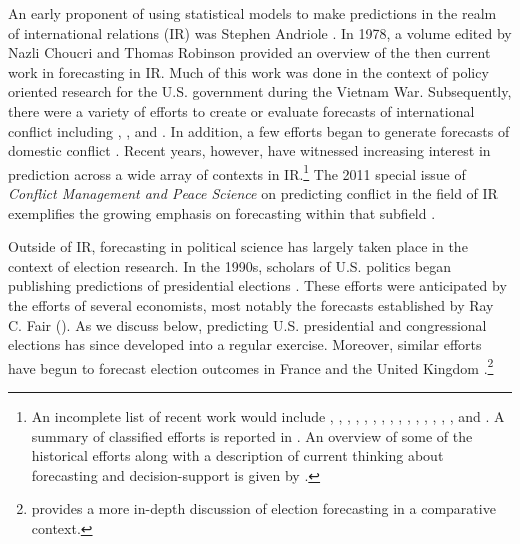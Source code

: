 \documentclass[pdftex,12pt,fullpage,oneside]{amsart}
\begin{document}
An early proponent of using statistical models to make predictions in
the realm of international relations (IR) was Stephen Andriole
\citep{Andriole:Young:1977}. In 1978, a volume edited by Nazli Choucri
and Thomas Robinson \nocite{Choucri:Robinson:1978} provided an
overview of the then current work in forecasting in IR.  Much of this
work was done in the context of policy oriented research for the
U.S. government during the Vietnam War.  Subsequently, there were a
variety of efforts to create or evaluate forecasts of international
conflict including \citet{Freeman:Job:1979},
\citet{Singer:Wallace:1979}, and \citet{Vincent:1980}.  In
addition, a few efforts began to generate forecasts of domestic
conflict \citep[e.g.,][]{Gurr:Lichbach:1986}.  Recent years,
however, have witnessed increasing interest in prediction across a
wide array of contexts in IR.\footnote{An incomplete list of recent
  work would include \citet{Krause:1997}, \citet{Davies:Gurr:1998},
  \citet{Pevehouse:Goldstein:1999}, \citet{Schrodt:Gerner:2000},
  \citet{King:Zeng:2001}, \citet{OBrien:2002}, \citet{BDM:2002},
  \citet{Fearon:Laitin:2003}, \citet{Demarchi:etal:2004},
  \citet{Ruger:2004}, \citet{Enders:Sandler:2005},
  \citet{Leblang:Satyanath:2006}, \citet{Ward:etal:2007},
  \citet{Brandt:etal:2008}, \citet{Bennett:Stam:2009}, and
  \citet{Gleditsch:Ward:2010}. A summary of classified efforts is
  reported in \citet{Feder:2002}.  An overview of some of the
  historical efforts along with a description of current thinking
  about forecasting and decision-support is given by
  \citet{OBrien:2010}.}  The 2011 special issue of \emph{Conflict
  Management and Peace Science} on predicting conflict in the field of
IR exemplifies the growing emphasis on forecasting within that
subfield \citep[c.f.,][]{Schneider_etal_2011, Mesquita_2011,
  Brandt_etal_2011}.

Outside of IR, forecasting in political science has largely taken
place in the context of election research.  In the 1990s, scholars of
U.S. politics began publishing predictions of presidential elections
\citep{Campbell:1990, Campbell:1992}. These efforts were anticipated
by the efforts of several economists, most notably the forecasts
established by Ray C. Fair (\citeyear{Fair:1978}). As we discuss
below, predicting U.S. presidential and congressional elections has
since developed into a regular exercise.  Moreover, similar efforts
have begun to forecast election outcomes in France
\citep[e.g.,][]{Jerome:1999} and the United Kingdom
\citep[e.g.,][]{Whitely:2005}.\footnote{\citet{Lewis-Beck:2005}
  provides a more in-depth discussion of election forecasting in a
  comparative context.}
\end{document}
